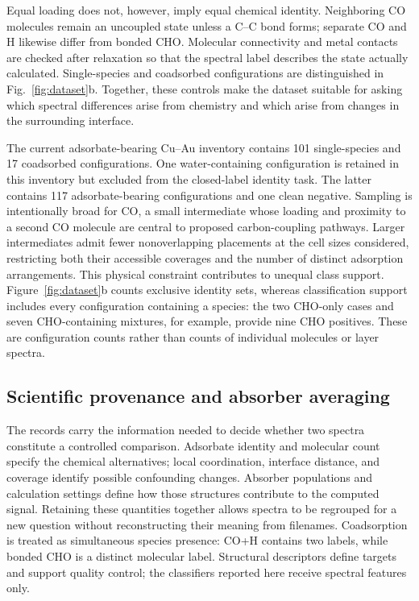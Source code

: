 \documentclass[11pt,a4paper]{article}
\begin{document}
Equal loading does not, however, imply equal chemical identity. Neighboring CO molecules remain an uncoupled state unless a C--C bond forms; separate CO and H likewise differ from bonded CHO. Molecular connectivity and metal contacts are checked after relaxation so that the spectral label describes the state actually calculated. Single-species and coadsorbed configurations are distinguished in Fig.~\ref{fig:dataset}b. Together, these controls make the dataset suitable for asking which spectral differences arise from chemistry and which arise from changes in the surrounding interface.

The current adsorbate-bearing Cu--Au inventory contains 101 single-species and 17 coadsorbed configurations. One water-containing configuration is retained in this inventory but excluded from the closed-label identity task. The latter contains 117 adsorbate-bearing configurations and one clean negative. Sampling is intentionally broad for CO, a small intermediate whose loading and proximity to a second CO molecule are central to proposed carbon-coupling pathways. Larger intermediates admit fewer nonoverlapping placements at the cell sizes considered, restricting both their accessible coverages and the number of distinct adsorption arrangements. This physical constraint contributes to unequal class support. Figure~\ref{fig:dataset}b counts exclusive identity sets, whereas classification support includes every configuration containing a species: the two CHO-only cases and seven CHO-containing mixtures, for example, provide nine CHO positives. These are configuration counts rather than counts of individual molecules or layer spectra.


\subsection{Scientific provenance and absorber averaging}
The records carry the information needed to decide whether two spectra constitute a controlled comparison. Adsorbate identity and molecular count specify the chemical alternatives; local coordination, interface distance, and coverage identify possible confounding changes. Absorber populations and calculation settings define how those structures contribute to the computed signal. Retaining these quantities together allows spectra to be regrouped for a new question without reconstructing their meaning from filenames. Coadsorption is treated as simultaneous species presence: CO+H contains two labels, while bonded CHO is a distinct molecular label. Structural descriptors define targets and support quality control; the classifiers reported here receive spectral features only.
\end{document}
